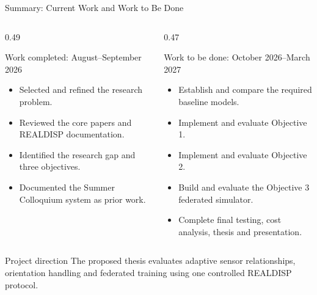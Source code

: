 \documentclass[10pt,aspectratio=169]{beamer}
\begin{document}
\begin{frame}[t]{Summary: Current Work and Work to Be Done}
\begin{columns}[T,onlytextwidth]
\begin{column}{0.49\textwidth}
\begin{block}{Work completed: August--September 2026}
\begin{itemize}
\item Selected and refined the research problem.
\item Reviewed the core papers and REALDISP documentation.
\item Identified the research gap and three objectives.
\item Documented the Summer Colloquium system as prior work.
\end{itemize}
\end{block}
\end{column}
\begin{column}{0.47\textwidth}
\begin{block}{Work to be done: October 2026--March 2027}
\begin{itemize}
\item Establish and compare the required baseline models.
\item Implement and evaluate Objective 1.
\item Implement and evaluate Objective 2.
\item Build and evaluate the Objective 3 federated simulator.
\item Complete final testing, cost analysis, thesis and presentation.
\end{itemize}
\end{block}
\end{column}
\end{columns}
\medskip
\begin{block}{Project direction}
The proposed thesis evaluates adaptive sensor relationships, orientation handling and federated training using one controlled REALDISP protocol.
\end{block}
\end{frame}
\end{document}

